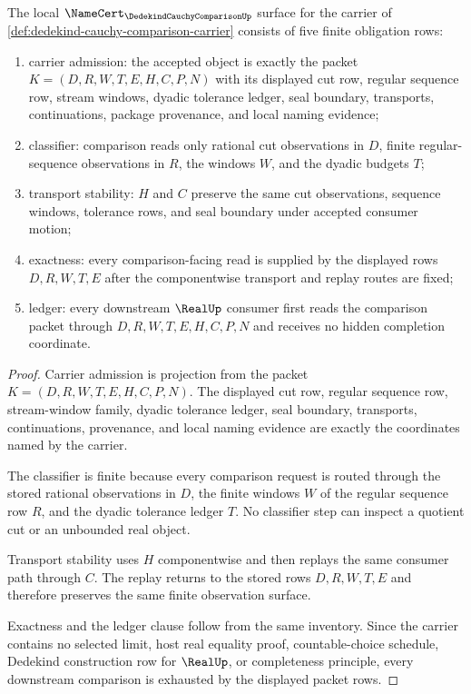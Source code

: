 \begin{theorem}
\label{thm:dedekind-cauchy-comparison-namecert-obligations}
The local $\NameCert_{\DedekindCauchyComparisonUp}$ surface for the carrier of \autoref{def:dedekind-cauchy-comparison-carrier} consists of five finite obligation rows:
\begin{enumerate}
\item carrier admission: the accepted object is exactly the packet $K=(D,R,W,T,E,H,C,P,N)$ with its displayed cut row, regular sequence row, stream windows, dyadic tolerance ledger, seal boundary, transports, continuations, package provenance, and local naming evidence;
\item classifier: comparison reads only rational cut observations in $D$, finite regular-sequence observations in $R$, the windows $W$, and the dyadic budgets $T$;
\item transport stability: $H$ and $C$ preserve the same cut observations, sequence windows, tolerance rows, and seal boundary under accepted consumer motion;
\item exactness: every comparison-facing read is supplied by the displayed rows $D,R,W,T,E$ after the componentwise transport and replay routes are fixed;
\item ledger: every downstream $\RealUp$ consumer first reads the comparison packet through $D,R,W,T,E,H,C,P,N$ and receives no hidden completion coordinate.
\end{enumerate}
\end{theorem}
\begin{proof}
Carrier admission is projection from the packet $K=(D,R,W,T,E,H,C,P,N)$. The displayed cut row, regular sequence row, stream-window family, dyadic tolerance ledger, seal boundary, transports, continuations, provenance, and local naming evidence are exactly the coordinates named by the carrier.

The classifier is finite because every comparison request is routed through the stored rational observations in $D$, the finite windows $W$ of the regular sequence row $R$, and the dyadic tolerance ledger $T$. No classifier step can inspect a quotient cut or an unbounded real object.

Transport stability uses $H$ componentwise and then replays the same consumer path through $C$. The replay returns to the stored rows $D,R,W,T,E$ and therefore preserves the same finite observation surface.

Exactness and the ledger clause follow from the same inventory. Since the carrier contains no selected limit, host real equality proof, countable-choice schedule, Dedekind construction row for $\RealUp$, or completeness principle, every downstream comparison is exhausted by the displayed packet rows.
\end{proof}

